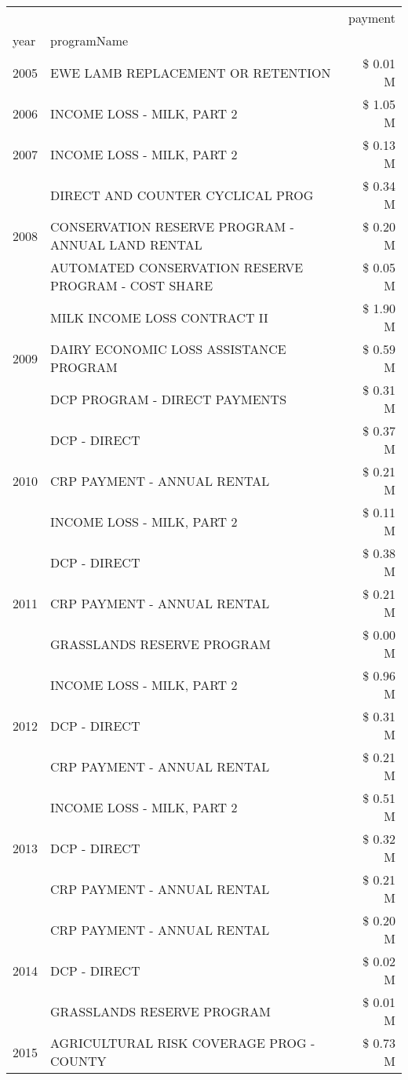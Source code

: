\begin{tabular}{llr}
\toprule
 &  & payment \\
year & programName &  \\
\midrule
2005 & EWE LAMB REPLACEMENT OR RETENTION & \$ 0.01 M \\
\cline{1-3}
2006 & INCOME LOSS - MILK, PART 2 & \$ 1.05 M \\
\cline{1-3}
2007 & INCOME LOSS - MILK, PART 2 & \$ 0.13 M \\
\cline{1-3}
\multirow[t]{3}{*}{2008} & DIRECT AND COUNTER CYCLICAL PROG & \$ 0.34 M \\
 & CONSERVATION RESERVE PROGRAM - ANNUAL LAND RENTAL & \$ 0.20 M \\
 & AUTOMATED CONSERVATION RESERVE PROGRAM - COST SHARE & \$ 0.05 M \\
\cline{1-3}
\multirow[t]{3}{*}{2009} & MILK INCOME LOSS CONTRACT II & \$ 1.90 M \\
 & DAIRY ECONOMIC LOSS ASSISTANCE PROGRAM & \$ 0.59 M \\
 & DCP PROGRAM - DIRECT PAYMENTS & \$ 0.31 M \\
\cline{1-3}
\multirow[t]{3}{*}{2010} & DCP - DIRECT & \$ 0.37 M \\
 & CRP PAYMENT - ANNUAL RENTAL & \$ 0.21 M \\
 & INCOME LOSS - MILK, PART 2 & \$ 0.11 M \\
\cline{1-3}
\multirow[t]{3}{*}{2011} & DCP - DIRECT & \$ 0.38 M \\
 & CRP PAYMENT - ANNUAL RENTAL & \$ 0.21 M \\
 & GRASSLANDS RESERVE PROGRAM & \$ 0.00 M \\
\cline{1-3}
\multirow[t]{3}{*}{2012} & INCOME LOSS - MILK, PART 2 & \$ 0.96 M \\
 & DCP - DIRECT & \$ 0.31 M \\
 & CRP PAYMENT - ANNUAL RENTAL & \$ 0.21 M \\
\cline{1-3}
\multirow[t]{3}{*}{2013} & INCOME LOSS - MILK, PART 2 & \$ 0.51 M \\
 & DCP - DIRECT & \$ 0.32 M \\
 & CRP PAYMENT - ANNUAL RENTAL & \$ 0.21 M \\
\cline{1-3}
\multirow[t]{3}{*}{2014} & CRP PAYMENT - ANNUAL RENTAL & \$ 0.20 M \\
 & DCP - DIRECT & \$ 0.02 M \\
 & GRASSLANDS RESERVE PROGRAM & \$ 0.01 M \\
\cline{1-3}
\multirow[t]{3}{*}{2015} & AGRICULTURAL RISK COVERAGE PROG - COUNTY & \$ 0.73 M \\

\end{tabular}
